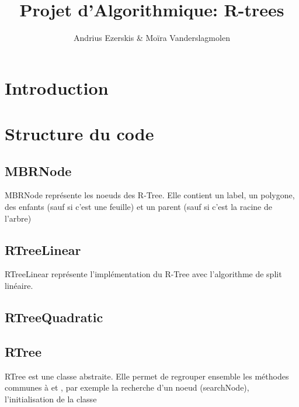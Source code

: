 \documentclass[utf8]{article}
\begin{document}
\begin{titlepage}


\author{Andrius Ezerskis \& Moïra Vanderslagmolen}
\title{Projet d'Algorithmique: R-trees}

\maketitle
\end{titlepage}
\tableofcontents
\newpage
\begin{large}



\section{Introduction}
\indent
\par


\par

\section{Structure du code}

\par
\subsection{MBRNode}
MBRNode représente les noeuds des R-Tree. Elle contient un label, un polygone,
des enfants (sauf si c'est une feuille) et un parent (sauf si c'est la racine de
l'arbre)

\subsection{RTreeLinear}
\label{RTreeLinear}

RTreeLinear représente l'implémentation du R-Tree avec l'algorithme de split linéaire.
\subsection{RTreeQuadratic}
\label{RTreeQuadratic}

\subsection{RTree}

RTree est une classe abstraite. Elle permet de regrouper ensemble les méthodes
communes à  et , par exemple la
recherche d'un noeud (searchNode), l'initialisation de la classe



\end{large}
\end{document}
